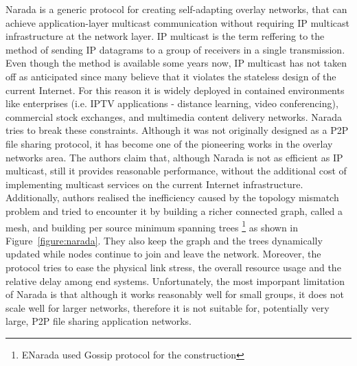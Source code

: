 Narada \cite{chu_esm_2000,chu_esm_2001,chu_esm_2002} is a generic protocol for
creating self-adapting overlay networks, that can achieve application-layer
multicast communication without requiring IP multicast infrastructure at the
network layer. IP multicast is the term reffering to the method of sending IP
datagrams to a group of receivers in a single transmission. Even though the
method is available some years now, IP multicast has not taken off as
anticipated since many believe that it violates the stateless design of the
current Internet. For this reason it is widely deployed in contained
environments like enterprises (i.e. IPTV applications - distance learning, video
conferencing), commercial stock exchanges, and multimedia content delivery
networks. Narada tries to break these constraints. Although it was not
originally designed as a P2P file sharing protocol, it has become one of the
pioneering works in the overlay networks area. The authors claim that, although
Narada is not as efficient as IP multicast, still it provides reasonable
performance, without the additional cost of implementing multicast services on
the current Internet infrastructure. Additionally, authors realised the
inefficiency caused by the topology mismatch problem and tried to encounter it
by building a richer connected graph, called a mesh, and building per source
minimum spanning trees \footnote{ENarada \cite{li_enarada_2008} used Gossip
protocol for the construction} as shown in Figure~\ref{figure:narada}. They also
keep the graph and the trees dynamically updated while nodes continue to join
and leave the network. Moreover, the protocol tries to ease the physical link
stress, the overall resource usage and the relative delay among end systems.
Unfortunately, the most imporpant limitation of Narada is that although it works
reasonably well for small groups, it does not scale well for larger networks,
therefore it is not suitable for, potentially very large, P2P file sharing
application networks.

